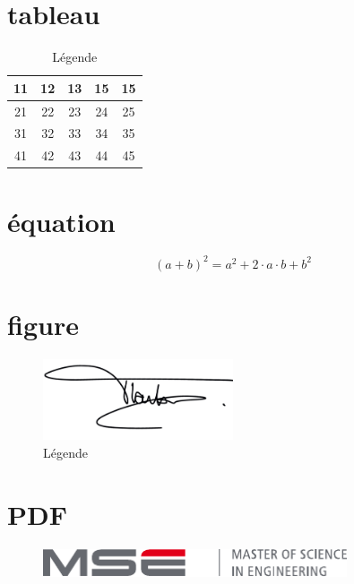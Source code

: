 \section{tableau}
\begin{table}[H]
\centering
    \begin{tabular}{|c|c|c|c|c|}
    \hline
    11 & 12 & 13 & 15 & 15  \\
    \hline
    21 & 22 & 23 & 24 & 25  \\
    \hline
    31 & 32 & 33 & 34 & 35  \\
    \hline
    41 & 42 & 43 & 44 & 45  \\      
    \hline
    \end{tabular}
    \caption{Légende}
    \label{table:Name}
\end{table}

\section{équation}
\begin{equation}
    \label{eq:Name}
    (a+b)^2 = a^2 + 2 \cdot a \cdot b + b^2 
\end{equation}

\section{figure}
\begin{figure}[H]
    \centering
    \includegraphics[width=0.5\textwidth]{Include/Figure/logo/SignatureTR.png}
    \caption{Légende}
    \label{fig:Name}
\end{figure}

\section{PDF}
\begin{figure}[H]
    \centering
    \includegraphics[width=0.8\textwidth]{Include/Figure/logo/mse-full-cropped.pdf}
\end{figure}

